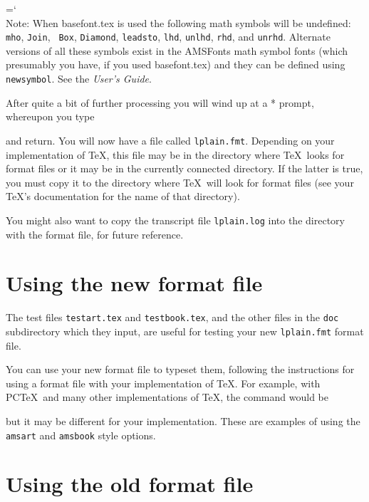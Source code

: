 \chardef\bsl=`\\
Note: When basefont.tex is used the following math symbols will be
undefined: {\tt\bsl mho},  {\tt\bsl Join},  {\tt\bsl
Box},  {\tt\bsl Diamond},  {\tt\bsl leadsto},  {\tt\bsl lhd}, 
{\tt\bsl unlhd},  {\tt\bsl rhd}, and {\tt\bsl unrhd}.  Alternate
versions of all these symbols exist in the AMSFonts math symbol fonts
(which presumably you have, if you used basefont.tex) and they can be
defined using {\tt\bsl newsymbol}.  See the {\it User's Guide}.

After quite a bit of further processing you will wind up at a * prompt,
whereupon you type 

\vskip-6pt

\noindent and return.  You will now have a file called \verb+lplain.fmt+.
Depending on your implementation of \TeX, this file may be in the directory
where \TeX\ looks for format files or it may be in the currently connected
directory. If the latter is true, you must copy it to the directory where \TeX\
will look for format files (see your \TeX's documentation for the name of that
directory).

You might also want to copy the transcript file \verb+lplain.log+ into the
directory with the format file, for future reference.

\section{Using the new format file}

The test files \verb+testart.tex+ and \verb+testbook.tex+, and the other files
in the \verb+doc+ subdirectory which they input, are useful for testing your
new \verb+lplain.fmt+ format file.

You can use your new format file to typeset them,
following the instructions for using a format file with your implementation of
\TeX. For example, with PC\TeX\ and many other implementations of \TeX, the
command would be


\noindent but it may be different for your implementation. These are examples
of using the \verb+amsart+ and \verb+amsbook+ style options.


\section{Using the old format file}

